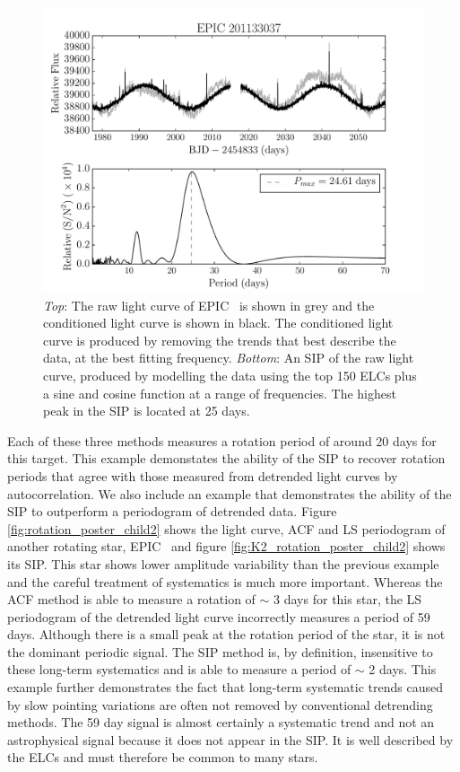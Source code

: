 \begin{figure}
\begin{center}
\includegraphics[width=6in, clip=true]{figures/K2_rotation_201133037.pdf}
\caption{{\it Top}: The raw light curve of EPIC \rpc\ is shown in grey and
	the conditioned light curve is shown in black. The conditioned light
	curve is produced by removing the trends that best describe the
	data, at the best fitting frequency. {\it Bottom}: An SIP of the raw
	light curve, produced by modelling the data using the top 150 ELCs
	plus a sine and cosine function at a range of frequencies.
	The highest peak in the SIP is located at 25 days.}
\label{fig:K2_rotation_poster_child}
\end{center}
\end{figure}

Each of these three methods measures a rotation period of around 20 days for
this target.
This example demonstates the ability of the SIP to recover rotation periods
that agree with those measured from detrended light curves by autocorrelation.
We also include an example that demonstrates the ability of the SIP to
outperform a periodogram of detrended data.
Figure \ref{fig:rotation_poster_child2} shows the light curve, ACF and LS
periodogram of another rotating star, EPIC \rpcc\ and figure
\ref{fig:K2_rotation_poster_child2} shows its SIP.
This star shows lower amplitude variability than the previous example and the
careful treatment of systematics is much more important.
Whereas the ACF method is able to measure a rotation of $\sim$ 3 days for
this star, the LS periodogram of the detrended light curve incorrectly
measures a period of 59 days.
Although there is a small peak at the rotation period of the star, it is not
the dominant periodic signal.
The SIP method is, by definition, insensitive to these long-term systematics
and is able to measure a period of $\sim$ 2 days.
This example further demonstrates the fact that long-term systematic trends
caused by slow pointing variations are often not removed by conventional
detrending methods.
The 59 day signal is almost certainly a systematic trend and not an
astrophysical signal because it does not appear in the SIP.
It is well described by the ELCs and must therefore be common to many stars.

